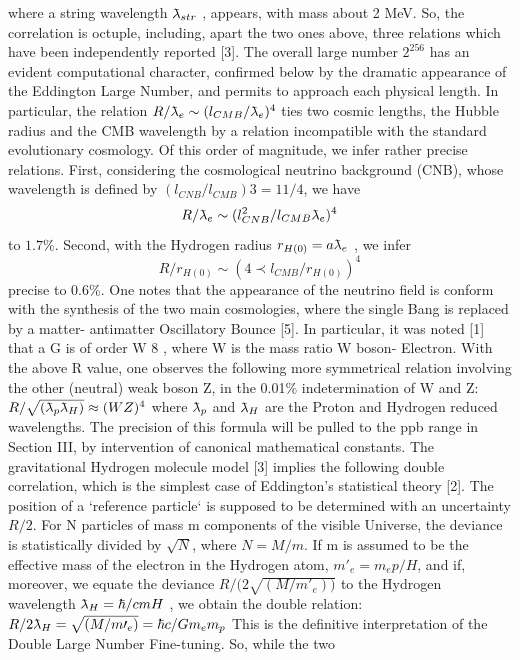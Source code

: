 where a string wavelength $\lambdabar_{str}$ , appears, with mass about 2 MeV. So, the correlation is octuple,
including, apart the two ones above, three relations which have been independently reported [3].
The overall large number $2^{256}$ has an evident computational character, confirmed below by the
dramatic appearance of the Eddington Large Number, and permits to approach each physical length.
In particular, the relation $R/ \lambdabar_{e} \sim (l_{CMB} / \lambdabar_{e} )^{4}$ ties two cosmic lengths, the Hubble radius and the CMB wavelength by a relation incompatible with the standard evolutionary cosmology. Of this order of
magnitude, we infer rather precise relations. First, considering the cosmological neutrino
background (CNB), whose wavelength is defined by $( l_{CNB} / l_{CMB} ) 3 = 11/4$, we have $$R/ \lambdabar_e \sim
( l_{CNB}^{2} / l_{CMB} \lambdabar_{e} )^{4}$$ to $1.7\%$. Second, with the Hydrogen radius $r_{H(0)} = a\lambdabar_{e}$ , we infer $$R/r_{H(0)} \sim
(4 \prec l_{CMB} /r_{H(0)} )^{4}$$ precise to $0.6\%$. One notes that the appearance of the neutrino field is conform
with the synthesis of the two main cosmologies, where the single Bang is replaced by a matter-
antimatter Oscillatory Bounce [5].
In particular, it was noted [1] that a G is of order W 8 , where W is the mass ratio W boson-
Electron. With the above R value, one observes the following more symmetrical relation involving
the other (neutral) weak boson Z, in the 0.01\% indetermination of W and Z:
$R/\sqrt{(\lambdabar_{p} \lambdabar_{H})} \approx (WZ)^4$
where $\lambdabar_{p}$ and $\lambdabar_{H}$ are the Proton and Hydrogen reduced wavelengths. The precision of this formula
will be pulled to the ppb range in Section III, by intervention of canonical mathematical constants.
The gravitational Hydrogen molecule model [3] implies the following double correlation,
which is the simplest case of Eddington's statistical theory [2]. The position of a `reference particle`
is supposed to be determined with an uncertainty ${R/2}$. For N particles of mass m components of the visible Universe, the deviance is statistically divided by $\sqrt{N}$, where $N = M/m$. If m is assumed to be
the effective mass of the electron in the Hydrogen atom, $m\prime_{e} = m_{e} p/H$, and if, moreover, we equate
the deviance $R/(2\sqrt{(M/m\prime_{e}))}$ to the Hydrogen wavelength $\lambdabar_{H} = \hbar/cm H$ , we obtain the double relation:
$R/2\lambdabar_{H} = \sqrt{(M/m\prime_{e} )} = \hbar c/Gm_{e} m_{p}$
This is the definitive interpretation of the Double Large Number Fine-tuning. So, while the two
